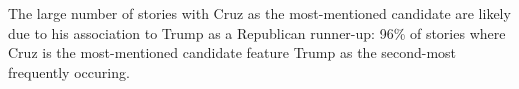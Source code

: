 The large number of stories with Cruz as the most-mentioned candidate are likely due to his association to Trump as a Republican runner-up: 96\% of stories where Cruz is the most-mentioned candidate feature Trump as the second-most frequently occuring.
 

 



  
